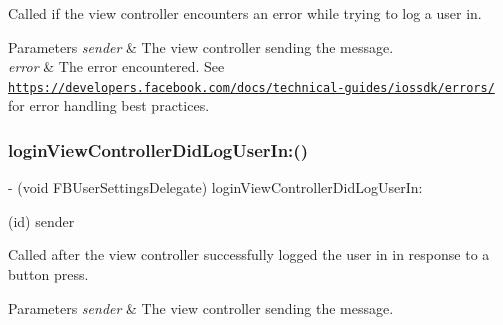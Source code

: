 Called if the view controller encounters an error while trying to log a user in.


\begin{DoxyParams}{Parameters}
{\em sender} & The view controller sending the message. \\
\hline
{\em error} & The error encountered.  See \href{https://developers.facebook.com/docs/technical-guides/iossdk/errors/}{\tt https\+://developers.\+facebook.\+com/docs/technical-\/guides/iossdk/errors/} for error handling best practices. \\
\hline
\end{DoxyParams}
\mbox{\label{protocolFBUserSettingsDelegate_01-p_a66711ccf72e173107d8be71887034d05}} 
\subsubsection{\texorpdfstring{login\+View\+Controller\+Did\+Log\+User\+In\+:()}{loginViewControllerDidLogUserIn:()}\hspace{0.1cm}{\footnotesize\ttfamily [1/5]}}
{\footnotesize\ttfamily -\/ (void F\+B\+User\+Settings\+Delegate) login\+View\+Controller\+Did\+Log\+User\+In\+: \begin{DoxyParamCaption}\item[{(id)}]{sender }\end{DoxyParamCaption}\hspace{0.3cm}{\ttfamily [optional]}}

Called after the view controller successfully logged the user in in response to a button press.


\begin{DoxyParams}{Parameters}
{\em sender} & The view controller sending the message. \\
\hline
\end{DoxyParams}
\mbox{\label{protocolFBUserSettingsDelegate_01-p_a66711ccf72e173107d8be71887034d05}} 
